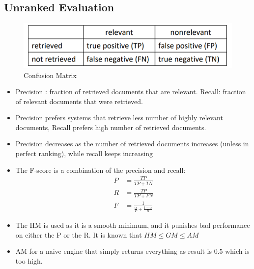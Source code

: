 \documentclass{article}
\begin{document}
\subsection{Unranked Evaluation}
\begin{figure}
    \centering
    \includegraphics[scale=0.9]{p1.png}
    \caption{Confusion Matrix}
    \label{fig:my_label}
\end{figure}
\begin{itemize}
    \item Precision : fraction of retrieved documents that are relevant. Recall: fraction of relevant documents that were retrieved.
    
    \item Precision prefers systems that retrieve less number of highly relevant documents, Recall prefers high number of retrieved documents. 
    
    \item Precision decreases as the number of retrieved documents increases (unless in perfect ranking), while recall keeps increasing 
    
    \item The F-score is a combination of the precision and recall:
    \begin{align}
        P &= \frac{TP}{TP+TN} \\
        R &= \frac{TP}{TP+FN} \\
        F &= \frac{1}{\frac{\alpha}{P} + \frac{1-\alpha}{R}}
    \end{align}
    
    \item The HM is used as it is a smooth minimum, and it punishes bad performance on either the P or the R. It is known that $HM \le GM \le AM$
    
    \item AM for a naive engine that simply returns everything as result is 0.5  which is too high. 
\end{itemize}
\end{document}
